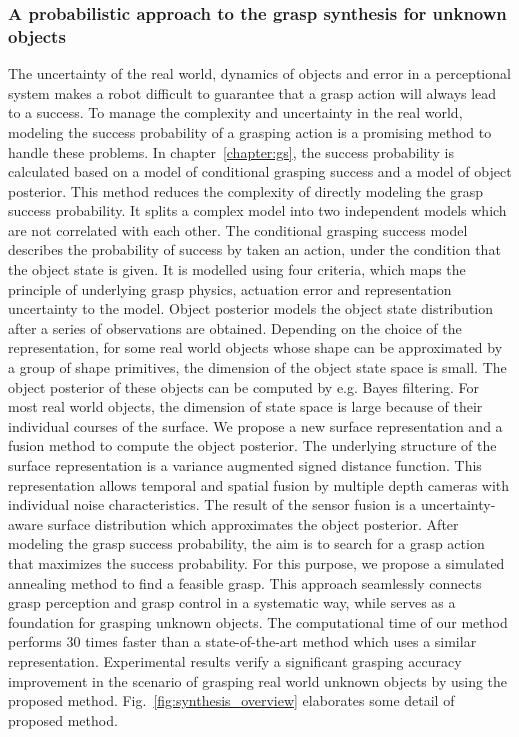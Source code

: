 \subsubsection{A probabilistic approach to the grasp synthesis for unknown objects }
The uncertainty of the real world, dynamics of objects and error in a perceptional 
system makes a robot difficult to guarantee that a grasp action will always lead to a 
success. To manage the complexity and uncertainty in the real world, modeling the success probability of a grasping action is a promising method to handle these problems. In chapter~\ref{chapter:gs}, the success probability is calculated based on a model of conditional grasping success and a model of object posterior. This method reduces the complexity of directly modeling the grasp success probability. It splits a complex model into two independent models which are not correlated with each other. The conditional grasping success model describes the probability of success by taken an action, under the condition that the object state is given. It is modelled using four criteria, which maps the principle of underlying grasp physics, actuation error and representation uncertainty to the model. Object posterior models the object state distribution after a series of observations are obtained. Depending on the choice of the representation, for some real world objects whose shape can be approximated by a group of shape primitives, the dimension of the object state space is small. The object posterior of these objects can be computed by e.g. Bayes filtering. For most real world objects, the dimension of state space is large because of their individual courses of the surface. We propose a new surface representation and a fusion method to compute the object posterior. The underlying structure of the surface representation is a variance augmented signed distance function. This representation allows temporal and spatial fusion by multiple depth cameras with individual noise characteristics. The result of the sensor fusion is a uncertainty-aware surface distribution which approximates the object posterior. After modeling the grasp success probability, the aim is to search for a grasp action that maximizes the success probability. For this purpose, we propose a simulated annealing method to find a feasible grasp. This approach seamlessly connects grasp perception and grasp control in a systematic way, while serves as a foundation for grasping unknown objects. The computational time of our method performs 30 times faster than a state-of-the-art method which uses a similar representation. Experimental results verify a significant grasping accuracy improvement in the scenario of grasping real world unknown objects by using the proposed method. Fig.~\ref{fig:synthesis_overview} elaborates some detail of proposed  method. 
